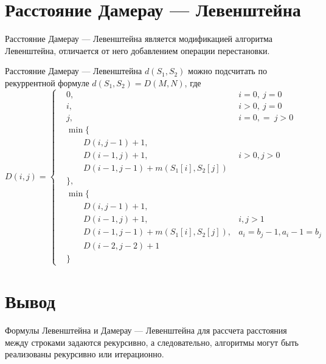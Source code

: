 \section{Расстояние Дамерау — Левенштейна}

Расстояние Дамерау — Левенштейна является модификацией алгоритма Левенштейна, отличается от него добавлением операции перестановки.

Расстояние Дамерау — Левенштейна $d(S_{1},S_{2})$ можно подсчитать по рекуррентной формуле $d(S_{1},S_{2}) = D(M,N)$, где\\
\[ 
D(i,j) = 
\left \{ \begin{aligned}
& 0, & i = 0, \medspace j = 0\\
& i, & i > 0, \medspace j = 0\\
& j, & i = 0,= \medspace j > 0\\
& \min\{ &\\
&   \qquad D(i, j - 1) + 1, &\\
&  \qquad D(i - 1, j) + 1, &i > 0, j > 0\\
&   \qquad D(i - 1, j - 1) + m(S_{1}[i], S_{2}[j]) &\\
& \},\\
& \min\{ &\\
&   \qquad D(i, j - 1) + 1, &\\
&   \qquad D(i - 1, j) + 1, &i, j > 1\\
&   \qquad D(i - 1, j - 1) + m(S_{1}[i], S_{2}[j]), &a_i = b_j - 1, a_i - 1 = b_j\\
&   \qquad D(i - 2, j - 2) + 1 &\\
& \} &
\end{aligned} \right.
\]

\section*{Вывод}

Формулы Левенштейна и Дамерау — Левенштейна для рассчета расстояния между строками задаются рекурсивно, а следовательно, алгоритмы могут быть реализованы рекурсивно или итерационно.
